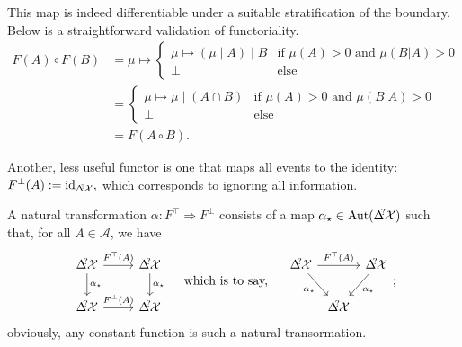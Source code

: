 \documentclass{article}
\DeclareMathOperator{\id}{id}
\begin{document}
    This map is indeed differentiable under a suitable stratification of the boundary. 
    Below is a straightforward validation of functoriality. 
    \begin{align*}
        F(A) \circ F(B) 
            &=  \mu \mapsto 
                \begin{cases}
                    \mu \mapsto (\mu \mid A) \mid B & \text{if $\mu(A) > 0$ and $\mu(B|A) > 0$} \\
                    \bot &\text{else}
                \end{cases} \\
            &= \begin{cases}
                    \mu \mapsto \mu \mid (A \cap B) & \text{if $\mu(A) > 0$ and $\mu(B|A) > 0$} \\
                    \bot &\text{else}
                \end{cases} \\
            &= F(A \circ B).
    \end{align*}
    
    Another, less useful functor is one that maps all events to the identity:
    $
        F^\bot(A) := \id_{\DX?},
    $ 
    which corresponds to ignoring all information. 
    
    \smallskip
    \begin{phaseout}
    A natural transformation $\alpha : F^\top \Rightarrow F^{\bot}$ consists of a map $\alpha_\star \in \mathrm{Aut}(\DX?)$ such that, for all $A \in \mathcal A$, we have
    \[
        \begin{tikzcd}
            \DX? \ar[r,"F^\top(A)"] \ar[d,"\alpha_\star"]
                & \DX? \ar[d, "\alpha_\star"] \\
            \DX? \ar[r,"F^{\bot}(A)"] & \DX?
        \end{tikzcd}
        \quad
        \text{ which is to say, }
        \quad
        \begin{tikzcd}[column sep=4]
            \DX? \ar[rr,"F^\top(A)"] \ar[dr,"\alpha_\star"']
                && \DX? \ar[dl, "\alpha_\star"] \\
            & \DX?
        \end{tikzcd};
    \]
    obviously, any constant function is such a natural transormation.
    \end{phaseout}
    \smallskip
    
\end{document}
